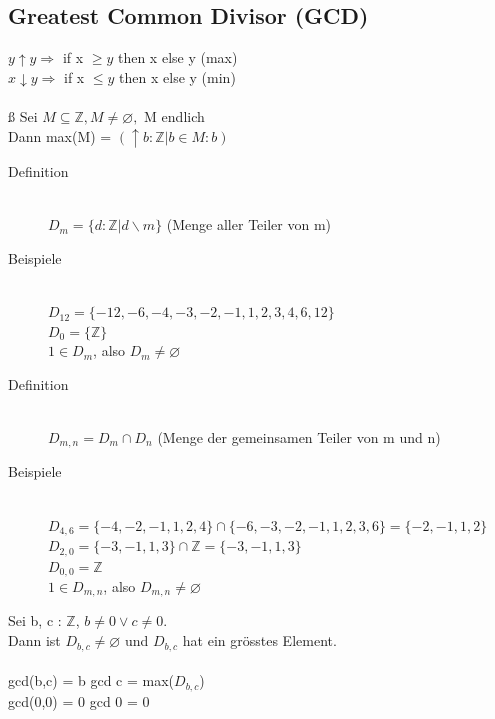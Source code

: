 \documentclass[a4paper,10pt]{article}
\newcommand{\ZN}{\mathbb{Z}} %
\newcommand{\Ra}{\Rightarrow}
\begin{document}
\subsection{Greatest Common Divisor (GCD)}
$y \uparrow y \Ra$ if x $\geq y$ then x else y (max) \\
$x \downarrow y \Ra$ if x $\leq y$ then x else y (min) \\ 
\\ß
Sei $M \subseteq \ZN, M \neq \varnothing,$ M endlich \\
Dann max(M) = $(\uparrow b: \ZN | b \in M:b)$

\begin{description}
	\item[Definition] \hfill \\
		$D_m = \{ d : \ZN | d \backslash m \}$ (Menge aller Teiler von m)
	\item[Beispiele] \hfill \\
		$D_{12} = \{-12, -6, -4, -3, -2, -1, 1, 2, 3, 4, 6, 12\}$ \\
		$D_0 = \{ \ZN \}$ \\
		$1 \in D_m$, also $D_m \neq\varnothing$
\end{description}
\begin{description}
	\item[Definition] \hfill \\
		$D_{m,n} = D_m \cap D_n$ (Menge der gemeinsamen Teiler von m und n)
	\item[Beispiele] \hfill \\
		$D_{4,6} = \{-4, -2, -1, 1, 2, 4\} \cap \{-6, -3, -2, -1, 1, 2, 3, 6\} = \{-2, -1, 1, 2\}$ \\
		$D_{2,0} = \{-3, -1, 1, 3\} \cap \ZN = \{-3, -1, 1, 3\}$ \\
		$D_{0,0} = \ZN$ \\
		$1 \in D_{m,n}$, also $D_{m,n} \neq \varnothing$
\end{description}
Sei b, c : $\ZN$, $b \neq 0 \vee c \neq 0$. \\
Dann ist $D_{b,c} \neq \varnothing$ und $D_{b,c}$ hat ein gr\"osstes Element.\\
\\
gcd(b,c) = b gcd c = max($D_{b,c}$) \\
gcd(0,0) = 0 gcd 0 = 0
\end{document}
